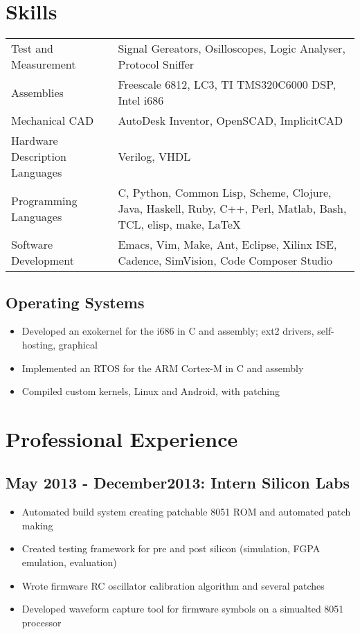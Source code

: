 \documentclass[letterpaper,12pt]{resume}
\begin{document}
\section{Skills}
\noindent
\begin{tabular}{p{}p{}}
  Test and Measurement&
  Signal Gereators, Osilloscopes, Logic Analyser, Protocol Sniffer\\
  \noalign{\smallskip}
  Assemblies&
  Freescale 6812, LC3, TI TMS320C6000 DSP, Intel i686\\
  \noalign{\smallskip}
  Mechanical CAD&
  AutoDesk Inventor, OpenSCAD, ImplicitCAD\\
  \noalign{\smallskip}
  Hardware Description Languages&
  Verilog, VHDL\\
  \noalign{\smallskip}
  Programming Languages&
  C, Python, Common Lisp, Scheme, Clojure, Java, Haskell, Ruby, C++, Perl, Matlab, Bash, TCL, elisp, make, \LaTeX\ \\
  \noalign{\smallskip}
  Software Development&
  Emacs, Vim, Make, Ant, Eclipse, Xilinx ISE, Cadence, SimVision, Code Composer Studio\\
\end{tabular}

\subsection{Operating Systems}
\begin{itemize}
  \item
    Developed an exokernel for the i686 in C and assembly; ext2 drivers, self-hosting, graphical
  \item
    Implemented an RTOS for the ARM Cortex-M in C and assembly
  \item
    Compiled custom kernels, Linux and Android, with patching
\end{itemize}

\section{Professional Experience}
\subsection{May 2013 - December2013: Intern Silicon Labs}
\begin{itemize}
  \item
    Automated build system creating patchable 8051 ROM and automated patch making
  \item
    Created testing framework for pre and post silicon (simulation, FGPA emulation, evaluation)
  \item
    Wrote firmware RC oscillator calibration algorithm and several patches
  \item
    Developed waveform capture tool for firmware symbols on a simualted 8051 processor
\end{itemize}
\end{document}
